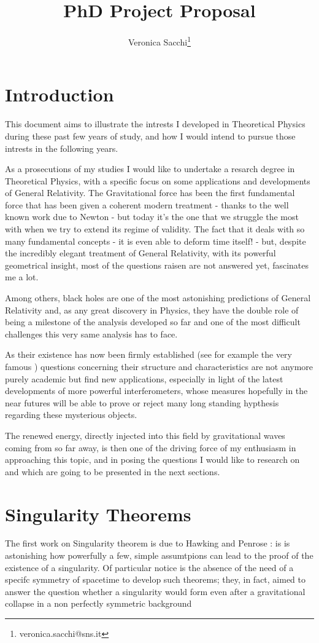 \documentclass[12pt, a4paper]{article}
\title{PhD Project Proposal}
\author{Veronica Sacchi\thanks{veronica.sacchi@sns.it}}
\begin{document}
\maketitle

\section{Introduction}
This document aims to illustrate the intrests I developed in Theoretical Physics during these past few years of study, and how I would intend to pursue those intrests in the following years.

As a prosecutions of my studies I would like to undertake a resarch degree in Theoretical Physics, with a specific focus on some applications and developments of General Relativity.
The Gravitational force has been the first fundamental force that has been given a coherent modern treatment - thanks to the well known work due to Newton - but today it's the one that we struggle the most with when we try to extend its regime of validity.
The fact that it deals with so many fundamental concepts -  it is even able to deform time itself! - but, despite the incredibly elegant treatment of General Relativity, with its powerful geometrical insight, most of the questions raisen are not answered yet, fascinates me a lot.

Among others, black holes are one of the most astonishing predictions of General Relativity and, as any great discovery in Physics, they have the double role of being a milestone of the analysis developed so far and one of the most difficult challenges this very same analysis has to face.

As their existence has now been firmly established (see for example the very famous \cite{falke}) questions concerning their structure and characteristics are not anymore purely academic but find new applications, especially in light of the latest developments of more powerful interferometers, whose measures hopefully in the near futures will be able to prove or reject many long standing hypthesis regarding these mysterious objects.

The renewed energy, directly injected into this field by gravitational waves coming from so far away, is then one of the driving force of my enthusiasm in approaching this topic, and in posing the questions I would like to research on and which are going to be presented in the next sections.

\section{Singularity Theorems}

The first work on Singularity theorem is due to Hawking \cite{hawking} and Penrose \cite{penrose}: is is astonishing how powerfully a few, simple assumtpions can lead to the proof of the existence of a singularity.
Of particular notice is the absence of the need of a specifc symmetry of spacetime to develop such theorems; they, in fact, aimed to answer the question whether a singularity would form even after a gravitational collapse in a non perfectly symmetric background
\clearpage


\printbibliography
\end{document}
